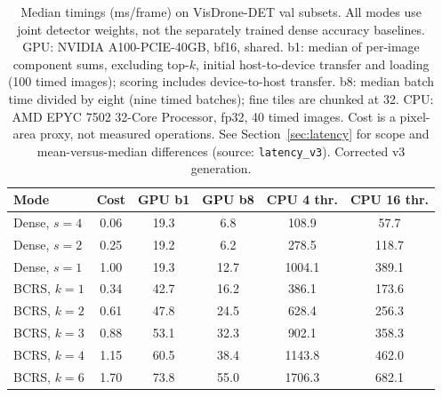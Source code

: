 \begin{table}[t]
\caption{Median timings (ms/frame) on VisDrone-DET val subsets. All modes use joint detector weights, not the separately trained dense accuracy baselines. GPU: NVIDIA A100-PCIE-40GB, bf16, shared. b1: median of per-image component sums, excluding top-$k$, initial host-to-device transfer and loading (100 timed images); scoring includes device-to-host transfer. b8: median batch time divided by eight (nine timed batches); fine tiles are chunked at 32. CPU: AMD EPYC 7502 32-Core Processor, fp32, 40 timed images. Cost is a pixel-area proxy, not measured operations. See Section~\ref{sec:latency} for scope and mean-versus-median differences (source: \texttt{latency\_v3}). Corrected v3 generation.}
\label{tab:latency}
\centering
\begin{tabular}{lccccc}
\toprule
Mode & Cost & GPU b1 & GPU b8 & CPU 4 thr. & CPU 16 thr. \\
\midrule
Dense, $s{=}4$ & 0.06 & 19.3 & 6.8 & 108.9 & 57.7 \\
Dense, $s{=}2$ & 0.25 & 19.2 & 6.2 & 278.5 & 118.7 \\
Dense, $s{=}1$ & 1.00 & 19.3 & 12.7 & 1004.1 & 389.1 \\
BCRS, $k{=}1$ & 0.34 & 42.7 & 16.2 & 386.1 & 173.6 \\
BCRS, $k{=}2$ & 0.61 & 47.8 & 24.5 & 628.4 & 256.3 \\
BCRS, $k{=}3$ & 0.88 & 53.1 & 32.3 & 902.1 & 358.3 \\
BCRS, $k{=}4$ & 1.15 & 60.5 & 38.4 & 1143.8 & 462.0 \\
BCRS, $k{=}6$ & 1.70 & 73.8 & 55.0 & 1706.3 & 682.1 \\
\bottomrule
\end{tabular}
\end{table}
